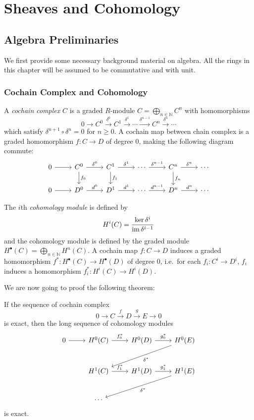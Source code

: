 \chapter{Sheaves and Cohomology}

\section{Algebra Preliminaries}

We first provide some necessary background material on algebra.
All the rings in this chapter will be assumed to be commutative and with unit.

\subsection*{Cochain Complex and Cohomology}

\begin{defn}
    A \emph{cochain complex} $C$ is a graded $R$-module $C=\bigoplus_{n\in\mathbb{N}}C^n$ with homomorphisms
    \[0\to C^0\xrightarrow{\delta^0}C^1\xrightarrow{\delta^1}\cdots\xrightarrow{\delta^{n-1}}C^n\xrightarrow{\delta^n}\cdots\]
    which satisfy $\delta^{n+1}\circ\delta^n=0$ for $n\geq 0$.
    A cochain map between chain complex is a graded homomorphism $f:C\to D$ of degree $0$, making the following diagram commute:
    \[\begin{tikzcd}
        0 \ar[r] & C^0 \ar[d, "f_0"] \ar[r,"\delta^0"] & C^1 \ar[d, "f_1"] \ar[r,"\delta^1"] & \cdots \ar[r,"\delta^{n-1}"] & C^n \ar[d, "f_n"] \ar[r,"\delta^n"] & \cdots \\
        0 \ar[r] & D^0 \ar[r,"d^0"] & D^1 \ar[r,"d^1"] & \cdots \ar[r, "d^{n-1}"] & D^n \ar[r, "d^n"] & \cdots
    \end{tikzcd}\]
\end{defn}

\begin{defn}
    The $i$th \emph{cohomology module} is defined by
    \[H^i(C)=\frac{\ker\delta^i}{\operatorname{im}\delta^{i-1}}\]
    and the cohomology module is defined by the graded module $H^\bullet(C)=\bigoplus_{n\in\mathbb{N}}H^n(C)$.
    A cochain map $f:C\to D$ induces a graded homomorphism $f^*:H^\bullet(C)\to H^\bullet(D)$ of degree $0$, i.e.\ for each $f_i:C^i\to D^i$, $f_i$ induces a homomorphism $f^*_i:H^i(C)\to H^i(D)$.
\end{defn}

We are now going to proof the following theorem:
\begin{thm}
    If the sequence of cochain complex
    \[0\to C\xrightarrow{f} D\xrightarrow{g} E\to 0\]
    is exact, then the long sequence of cohomology modules
    \[\begin{tikzcd}
        0 \ar[r] & H^0(C) \ar[r, "f_0^*"] & H^0(D) \ar[r, "g_0^*"] & H^0(E) \ar[dll, "\delta^*"] \\[3mm]
        {} & H^1(C) \ar[r, "f_1^*"] & H^1(D) \ar[r, "g_1^*"] & H^1(E) \ar[dll, "\delta^*"] \\[3mm]
        {} & \cdots & {} & {}
    \end{tikzcd}\]
    is exact.
\end{thm}

